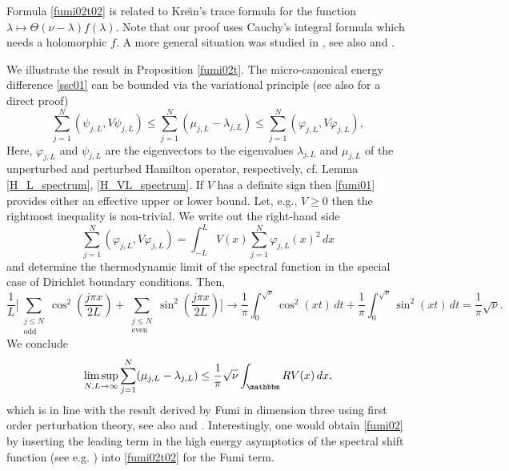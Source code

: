 Formula \eqref{fumi02t02} is related to Kre\u\i{}n's trace formula for the function
$\lambda\mapsto \Theta(\nu-\lambda)f(\lambda)$.
Note that our proof uses Cauchy's integral formula which needs a holomorphic $f$.
A more general situation was studied in \cite{FrankPushnitski2015}, see also \cite{KohmotoKomaNakamura2012}
and \cite{peller2016}.

We illustrate the result in Proposition \ref{fumi02t}. 
The micro-canonical energy difference \eqref{ssc01} can be bounded via the variational principle 
(see also \cite{Gasymov1963,Gasymov1964} for a direct proof)
\begin{equation}\label{fumi01}
  \sum_{j=1}^N (\psi_{j,L}, V\psi_{j,L}) 
   \leq \sum_{j=1}^N (\mu_{j,L}-\lambda_{j,L})
   \leq \sum_{j=1}^N (\varphi_{j,L},V\varphi_{j,L}) ,
\end{equation}
Here, $\varphi_{j,L}$ and $\psi_{j,L}$ are the eigenvectors to the eigenvalues $\lambda_{j,L}$ and 
$\mu_{j,L}$ of the unperturbed and perturbed Hamilton operator, respectively, cf. Lemma \ref{H_L_spectrum}, \eqref{H_VL_spectrum}. 
If $V$ has a definite sign then \eqref{fumi01} provides either an effective upper or lower bound. Let, e.g.,
$V\geq 0$ then the rightmost inequality is non-trivial. We write out the right-hand side
\begin{equation*}
  \sum_{j=1}^N (\varphi_{j,L},V\varphi_{j,L}) = \int_{-L}^L V(x) \sum_{j=1}^N \varphi_{j,L}(x)^2 \, dx
\end{equation*}
and determine the thermodynamic limit of the spectral function in the special case of Dirichlet boundary conditions. 
Then,
\begin{equation*}
  \frac{1}{L} \Big[ 
    \sum_{\substack{ j\leq N \\ \text{odd}}} \cos^2(\frac{j\pi x}{2L})
  + \sum_{\substack{ j\leq N \\ \text{even}}} \sin^2(\frac{j\pi x}{2L})
              \Big]
   \to \frac{1}{\pi} \int_0^{\sqrt{\nu}} \cos^2(xt)\, dt
  + \frac{1}{\pi} \int_0^{\sqrt{\nu}} \sin^2(xt)\, dt
  = \frac{1}{\pi} \sqrt{\nu} .
\end{equation*}
We conclude
\begin{equation}\label{fumi02}
  \limsup_{N,L\to\infty} \sum_{j=1}^N (\mu_{j,L}-\lambda_{j,L})
   \leq \frac{1}{\pi} \sqrt{\nu} \int_\R V(x)\, dx ,
\end{equation}
which is in line with the result derived by Fumi \cite[Eq. 6]{Fumi1955} in dimension three using first order perturbation theory, 
see also \cite[Eq. 14]{Affleck1997} and \cite[Eq. 26]{FrankLewinLiebSeiringer2011}.
Interestingly, one would obtain \eqref{fumi02} by inserting the leading term in the high energy asymptotics 
of the spectral shift function (see e.g. \cite[Thm. 2]{AsselDimassi2008}) into \eqref{fumi02t02}
for the Fumi term.
